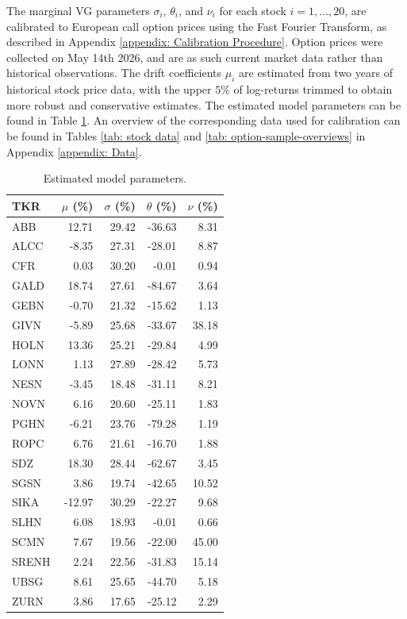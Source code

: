 The marginal VG parameters $\sigma_i$, $\theta_i$, and $\nu_i$ for each stock $i=1,\ldots,20$, are calibrated to European call option prices using the Fast Fourier Transform, as described in Appendix \ref{appendix: Calibration Procedure}. Option prices were collected on May 14th 2026, and are as such current market data rather than historical observations. The drift coefficients $\mu_i$ are estimated from two years of historical stock price data, with the upper $5\%$ of log-returns trimmed to obtain more robust and conservative estimates. The estimated model parameters can be found in Table \ref{tab: parameter estimates percent}. An overview of the corresponding data used for calibration can be found in Tables \ref{tab: stock data} and \ref{tab: option-sample-overviews} in Appendix \ref{appendix: Data}. 
\begin{table}[!htbp]
    \centering
    \begin{tabular}{lrrrr}
        \toprule
        TKR & $\mu$ (\%) & $\sigma$ (\%) & $\theta$ (\%) & $\nu$ (\%) \\
        \midrule
        ABB   &  12.71 & 29.42 & -36.63 &  8.31 \\
        ALCC  &  -8.35 & 27.31 & -28.01 &  8.87 \\
        CFR   &   0.03 & 30.20 &  -0.01 &  0.94 \\
        GALD  &  18.74 & 27.61 & -84.67 &  3.64 \\
        GEBN  &  -0.70 & 21.32 & -15.62 &  1.13 \\
        GIVN  &  -5.89 & 25.68 & -33.67 & 38.18 \\
        HOLN  &  13.36 & 25.21 & -29.84 &  4.99 \\
        LONN  &   1.13 & 27.89 & -28.42 &  5.73 \\
        NESN  &  -3.45 & 18.48 & -31.11 &  8.21 \\
        NOVN  &   6.16 & 20.60 & -25.11 &  1.83 \\
        PGHN  &  -6.21 & 23.76 & -79.28 &  1.19 \\
        ROPC  &   6.76 & 21.61 & -16.70 &  1.88 \\
        SDZ   &  18.30 & 28.44 & -62.67 &  3.45 \\
        SGSN  &   3.86 & 19.74 & -42.65 & 10.52 \\
        SIKA  & -12.97 & 30.29 & -22.27 &  9.68 \\
        SLHN  &   6.08 & 18.93 &  -0.01 &  0.66 \\
        SCMN  &   7.67 & 19.56 & -22.00 & 45.00 \\
        SRENH &   2.24 & 22.56 & -31.83 & 15.14 \\
        UBSG  &   8.61 & 25.65 & -44.70 &  5.18 \\
        ZURN  &   3.86 & 17.65 & -25.12 &  2.29 \\
        \bottomrule
    \end{tabular}
    \caption{Estimated model parameters.}
    \label{tab: parameter estimates percent}
\end{table}
